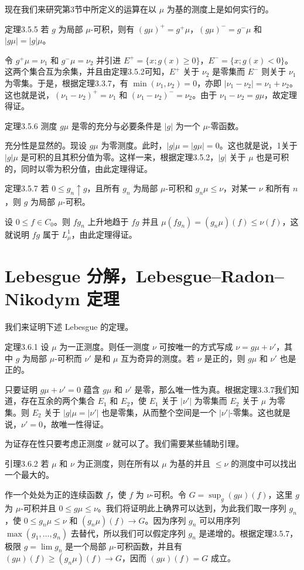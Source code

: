 现在我们来研究第3节中所定义的运算在以 $\mu$ 为基的测度上是如何实行的。
\begin{statement}{定理}{3.5.5}
若 $g$ 为局部 $\mu$-可积，则有 $(g\mu)^+=g^+\mu$，$(g\mu)^-=g^-\mu$ 和 $|g\mu|=|g|\mu$。
\end{statement}
\Proof 令 $g^+\mu=\nu_1$ 和 $g^-\mu=\nu_2$ 并引进 $E^+=\{x;g(x)\ge0\}$，$E^-=\{x;g(x)<0\}$。这两个集合互为余集，并且由定理3.5.2可知，$E^+$ 关于 $\nu_2$ 是零集而 $E^-$ 则关于 $\nu_1$ 为零集。于是，根据定理3.3.7，有 $\min(\nu_1,\nu_2)=0$，亦即 $|\nu_1-\nu_2|=\nu_1+\nu_2$。这也就是说，$(\nu_1-\nu_2)^+=\nu_1$ 和 $(\nu_1-\nu_2)^-=\nu_2$。由于 $\nu_1-\nu_2=g\mu$，故定理得证。
\begin{statement}{定理}{3.5.6}
测度 $g\mu$ 是零的充分与必要条件是 $|g|$ 为一个 $\mu$-零函数。
\end{statement}
\Proof 充分性是显然的。现设 $g\mu$ 为零测度。此时，$|g|\mu=|g\mu|=0$。这也就是说，1关于 $|g|\mu$ 是可积的且其积分值为零。这样一来，根据定理3.5.2，$|g|$ 关于 $\mu$ 也是可积的，同时以零为积分值，由此定理得证。
\begin{statement}{定理}{3.5.7}
若 $0\le g_n\uparrow g$，且所有 $g_n$ 为局部 $\mu$-可积和 $g_n\mu\le\nu$，对某一 $\nu$ 和所有 $n$，则 $g$ 为局部 $\mu$-可积。
\end{statement}
\Proof 设 $0\le f\in C_0$。则 $fg_n$ 上升地趋于 $fg$ 并且 $\mu(fg_n)=(g_n\mu)(f)\le\nu(f)$，这就说明 $fg$ 属于 $L^1_\mu$，由此定理得证。
\section{Lebesgue 分解，Lebesgue--Radon--Nikodym 定理}
我们来证明下述 Lebesgue 的定理。
\begin{statement}{定理}{3.6.1}
设 $\mu$ 为一正测度。则任一测度 $\nu$ 可按唯一的方式写成 $\nu=g\mu+\nu'$，其中 $g$ 为局部 $\mu$-可积而 $\nu'$ 是和 $\mu$ 互为奇异的测度。若 $\nu$ 是正的，则 $g\mu$ 和 $\nu'$ 也是正的。
\end{statement}
\Proof 只要证明 $g\mu+\nu'=0$ 蕴含 $g\mu$ 和 $\nu'$ 是零，那么唯一性为真。根据定理3.3.7我们知道，存在互余的两个集合 $E_1$ 和 $E_2$，使 $E_1$ 关于 $|\nu'|$ 为零集而 $E_2$ 关于 $\mu$ 为零集。则 $E_2$ 关于 $|g|\mu=|\nu'|$ 也是零集，从而整个空间是一个 $|\nu'|$-零集。这也就是说，$\nu'=0$，故唯一性得证。

为证存在性只要考虑正测度 $\nu$ 就可以了。我们需要某些辅助引理。
\begin{statement}{引理}{3.6.2}
若 $\mu$ 和 $\nu$ 为正测度，则在所有以 $\mu$ 为基的并且 $\le\nu$ 的测度中可以找出一个最大的。
\end{statement}
\Proof 作一个处处为正的连续函数 $f$，使 $f$ 为 $\nu$-可积。令 $G=\sup_g(g\mu)(f)$，这里 $g$ 为 $\mu$-可积并且 $0\le g\mu\le\nu$。我们将证明此上确界可以达到，为此我们取一序列 $g_n$，使 $0\le g_n\mu\le\nu$ 和 $(g_n\mu)(f)\to G$。因为序列 $g_n$ 可以用序列 $\max(g_1,\ldots,g_n)$ 去替代，所以我们可以假定序列 $g_n$ 是递增的。根据定理3.5.7，极限 $g=\lim g_n$ 是一个局部 $\mu$-可积函数，并且有 $(g\mu)(f)\ge(g_n\mu)(f)\to G$，因而 $(g\mu)(f)=G$ 成立。

